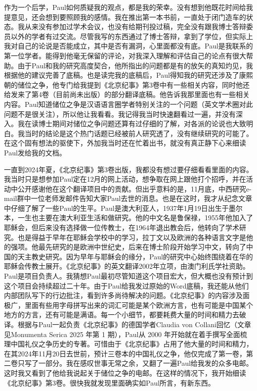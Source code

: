 作为一个后学，Paul如何质疑我的观点，都是我的荣幸。没有想到他既花时间给我提意见，还会想到要照顾我的感情。我在推出第一本书前，一直处于闭门造车的状态。我从来没有参加过学术会议，也没有给期刊投过稿，完全没有跟我博士答辩委员以外的学者有过交流。尽管我写的东西通过了博士答辩，拿到了学位，但实际上我对自己的论说是否能成立，其中是否有漏洞，心里面都没有底。Paul是我联系的第一位学者。能得到他毫无保留的评论，对我深入理解和评估自己的论点有很大帮助。由于Paul和我的研究高度契合，他所指出的问题都是有的放矢的真知灼见，我根据他的建议完善了底稿。也是读完我的底稿后，Paul得知我的研究还涉及了康熙朝的储位之争，他专门给我提到《北京纪事》第3卷中有一些相关内容，同时他还给发来了第4卷（目前尚未出版）的部分翻译底稿。他告诉我那里面也有一些相关内容。Paul知道储位之争是汉语语言圈学者特别关注的一个问题（英文学术圈对此问题不是很关注），所以他让我看看。我记得我当时快速翻看过一遍，并没有深入。我在读博士期间对储位之争问题还算有过仔细的了解，对各派的论说也大致明白。我当时的结论是这个热门话题已经被前人研究透了，没有继续研究的可能了。在这个固有想法的驱使下，外加我当时还在忙着出书，就没有真正静下心来细读Paul发给我的文档。



一直到2024年夏，《北京纪事》第3卷出版，我都没有想过要仔细看看里面的内容。我当时只是想参加Paul定在12月的网上活动，想争取在网上跟他打个招呼，并在活动中公开感谢他在这个翻译项目中的贡献。但出乎意料的是，11月底，中西研究e-mail群中一位老师发邮件告知大家Paul去世的消息。也是在这时，我才从纪念文章中仔细了解了一些Paul的生平。Paul是澳大利亚人，1937年1月19日出生于墨尔本，一生也主要在澳大利亚生活和做研究。他的中文名是鲁保禄，1955年他加入了耶稣会，但后来没有选择做一位传教士，在1964年退出教会后，他转向了学术研究。也是得益于早年在耶稣会学校中的学习，拉丁文以及欧洲的各种语言文字是他的强项。他最先研究的是欧洲中世纪史，后来在博士阶段开始学习中文，转向了中国的天主教史研究。因为早年与耶稣会的缘分，Paul的研究中心始终围绕着在华的耶稣会传教士展开。《北京纪事》的英文翻译2002年立项，由澳门利氏学社资助。Paul是项目负责人。我猜想Paul最初尽管知道这个项目宏大，但大概也没有预计到这个项目会持续超过二十年。由于Paul给我发过原始的Word底稿，我还能从他们内部团队写下的行边批注，看到许多尚待解决的问题。《北京纪事》的内容涉及面极广，里面有些用字母拼写出来的词汇可能是某个欧洲方言，也有可能是中国某个地方的方言，还有可能是满语。每一个小细节，都要耗费大量的时间和精力去破译。根据与Paul一起负责《北京纪事》的德国学者Claudia von Collani回忆（文章见Monumenta Serica 2025 年第 1 期），Paul从 2000 年开始就在着手撰写全面梳理中国礼仪之争历史的专著。可惜由于《北京纪事》占用了他大量的时间和精力，在其2024年11月20日去世前，预计三卷本的中国礼仪之争，他仅完成了第一卷，第二卷只写了一部分。我在感叹世事无常之余，又翻了一遍Paul给我发的众多电邮。这时我又看到了他给我说起关于储位之争的电邮。在这样的情况下，我开始细读《北京纪事》第3卷。很快我就发现里面确实如Paul所言，有新东西。


